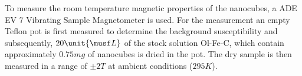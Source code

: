 \documentclass[\main/dresen_thesis.tex]{subfiles}
\begin{document}
    To measure the room temperature magnetic properties of the nanocubes, a ADE EV 7 Vibrating Sample Magnetometer is used.
    For the measurement an empty Teflon pot is first measured to determine the background susceptibility and subsequently, $20 \unit{\musf L}$ of the stock solution Ol-Fe-C, which contain approximately $0.75 \unit{mg}$ of nanocubes is dried in the pot.
    The dry sample is then measured in a range of $\pm 2 \unit{T}$ at ambient conditions ($295 \unit{K}$).
\end{document}
